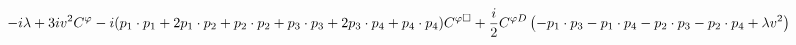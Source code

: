 %
\begin{dmath*}
%
  -  i \lambda   +  3 i v^2C^{\varphi }  -  i(p_{1}\nobreak\cdot\nobreak{}p_{1} + 2 p_{1}\nobreak\cdot\nobreak{}p_{2} + p_{2}\nobreak\cdot\nobreak{}p_{2} + p_{3}\nobreak\cdot\nobreak{}p_{3} + 2 p_{3}\nobreak\cdot\nobreak{}p_{4} + p_{4}\nobreak\cdot\nobreak{}p_{4}) C^{ \varphi  \Box}  +  \frac{i}{2}C^{ \varphi  D} \left( - p_{1}\nobreak\cdot\nobreak{}p_{3} - p_{1}\nobreak\cdot\nobreak{}p_{4} - p_{2}\nobreak\cdot\nobreak{}p_{3} - p_{2}\nobreak\cdot\nobreak{}p_{4} + \lambda v^2\right)
%
\end{dmath*}
%
